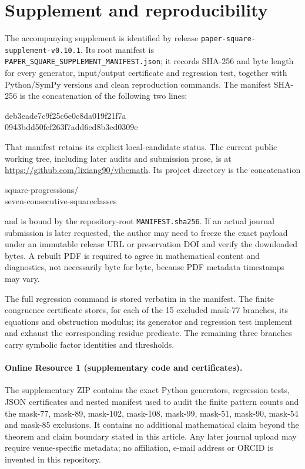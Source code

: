 \documentclass[11pt]{article}
\begin{document}
\section{Supplement and reproducibility}
The accompanying supplement is identified by release
\texttt{paper-square-supplement-v0.10.1}.  Its root manifest is
\texttt{PAPER\_SQUARE\_SUPPLEMENT\_MANIFEST.json}; it records SHA-256 and
byte length for every generator, input/output certificate and regression
test, together with Python/SymPy versions and clean reproduction commands.
The manifest SHA-256 is the concatenation of the following two lines:
\begin{center}\small\ttfamily
deb3eade7c9f25c6e0c8da019f21f7a\\
0943bdd50fcf263f7add6ed8b3ed0309e
\end{center}
That manifest retains its explicit local-candidate status.  The
current public working tree, including later audits and submission prose, is
at \url{https://github.com/lixiang90/vibemath}.  Its project directory is the
concatenation
\begin{center}\small\ttfamily
square-progressions/\\
seven-consecutive-squareclasses
\end{center}
and is bound by the repository-root \texttt{MANIFEST.sha256}.  If an actual
journal submission is later requested, the author may need to freeze the exact
payload under an immutable release URL or preservation DOI and verify the
downloaded bytes. A rebuilt PDF is
required to agree in mathematical content and diagnostics, not necessarily
byte for byte, because PDF metadata timestamps may vary.

The full regression command is stored verbatim in the manifest.  The finite
congruence certificate stores, for each of the 15 excluded mask-77 branches,
its equations and obstruction modulus; its generator and regression test
implement and exhaust the corresponding residue predicate.  The remaining
three branches carry symbolic factor identities and thresholds.

\paragraph{Online Resource 1 (supplementary code and certificates).}
The supplementary ZIP contains the exact Python generators, regression tests,
JSON certificates and nested manifest used to audit the finite pattern counts
and the mask-77, mask-89, mask-102, mask-108, mask-99, mask-51, mask-90, mask-54 and mask-85 exclusions.  It contains no
additional mathematical claim beyond the theorem and claim boundary stated in
this article. Any later journal upload may require venue-specific metadata;
no affiliation, e-mail address or ORCID is invented in this repository.
\end{document}
